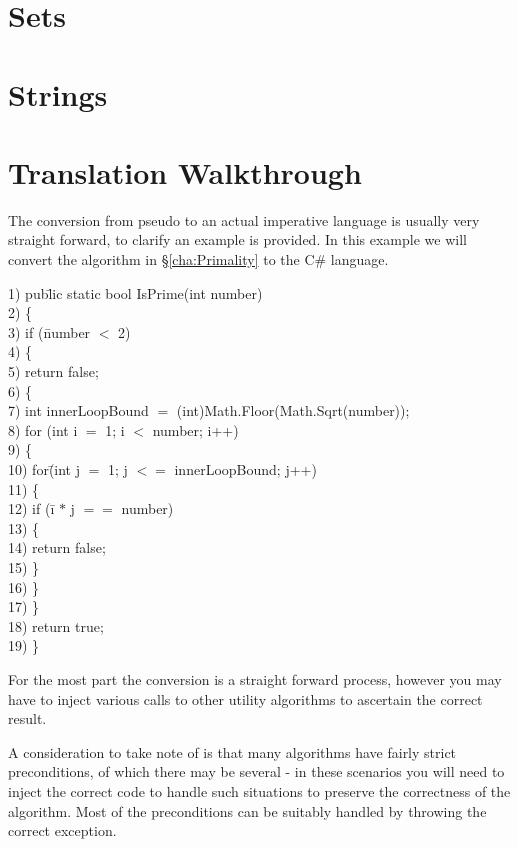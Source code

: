 \documentclass[10pt,oneside,a4paper]{report}
\begin{document}
\chapter{Sets}

\chapter{Strings}

\appendix
\chapter{Translation Walkthrough}
The conversion from pseudo to an actual imperative language is usually very straight forward, to clarify an example is provided.
In this example we will convert the algorithm in \S\ref{cha:Primality} to the C\# language.

\begin{tabbing}
1) pub\=lic static bool IsPrime(int number) \\
2) \{ \\
3) \> if (\=number $<$ 2) \\
4) \> \{ \\
5) \> \> return false; \\
6) \> \{ \\ 
7) \> int innerLoopBound $=$ (int)Math.Floor(Math.Sqrt(number)); \\
8) \> for (int i $=$ 1; i $<$ number; i++) \\
9) \> \{ \\
10) \> \> for\= (int j $=$ 1; j $<=$ innerLoopBound; j++) \\
11) \> \> \{ \\
12) \> \> \> if (\=i $*$ j $==$ number) \\
13) \> \> \> \{ \\
14) \> \> \> \> return false; \\
15) \> \> \> \} \\
16) \> \> \} \\
17) \> \} \\
18) \> return true; \\
19) \} \\
\end{tabbing}

For the most part the conversion is a straight forward process, however you may have to inject various calls to other utility algorithms to ascertain the correct result.

A consideration to take note of is that many algorithms have fairly strict preconditions, of which there may be several - in these scenarios you will need to inject the correct code to handle such situations to preserve the correctness of the algorithm. Most of the preconditions can be suitably handled by throwing the correct exception.
\end{document}
